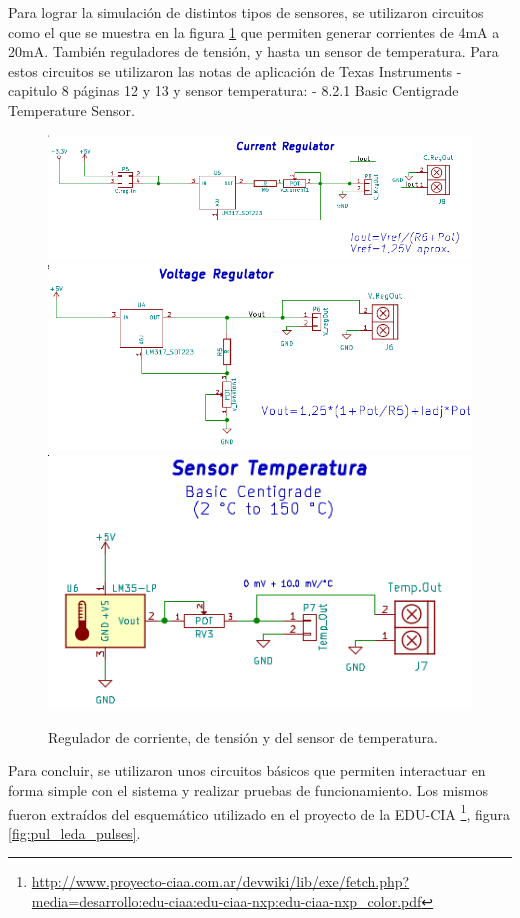 Para lograr la simulación de distintos tipos de sensores, se utilizaron circuitos como el que se muestra en la figura \ref{fig:temp_tens}  que permiten generar corrientes de 4mA a 20mA. También reguladores de tensión, y hasta un sensor de temperatura. Para estos circuitos se utilizaron las notas de aplicación de Texas Instruments\citep{Texas:LM317} - capitulo 8 páginas 12 y 13 y sensor temperatura: \citep{Texas:LM35} - 8.2.1 Basic Centigrade Temperature Sensor. 
\begin{figure}[!hp]
  \centering
  \includegraphics[scale=0.5]{./Figures/sch_ireg.png}
  \includegraphics[scale=0.5]{./Figures/sch_vreg.png}
  \includegraphics[scale=0.5]{./Figures/sch_lm35.png}
  \caption{Regulador de corriente, de tensión y del sensor de temperatura.}
  \label{fig:temp_tens}
\end{figure}

Para concluir, se utilizaron unos circuitos básicos que permiten interactuar en forma simple con el sistema y realizar pruebas de funcionamiento. Los mismos fueron extraídos del esquemático utilizado en el proyecto de la EDU-CIA \footnote{\url{http://www.proyecto-ciaa.com.ar/devwiki/lib/exe/fetch.php?media=desarrollo:edu-ciaa:edu-ciaa-nxp:edu-ciaa-nxp\_color.pdf}}, figura \ref{fig:pul_leda_pulses}.


